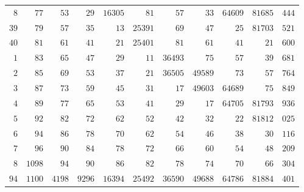 \begin{longtable}{@{}r|r|r|r|r|r|r|r|r|r|r@{}}
$8$ & $77$ & $53$ & $29$ & $16305$ & $81$ & $57$ & $33$ & $64609$ & $81685$ & $444$\\
$39$ & $79$ & $57$ & $35$ & $13$ & $25391$ & $69$ & $47$ & $25$ & $81703$ & $521$\\
$40$ & $81$ & $61$ & $41$ & $21$ & $25401$ & $81$ & $61$ & $41$ & $21$ & $600$\\
$1$ & $83$ & $65$ & $47$ & $29$ & $11$ & $36493$ & $75$ & $57$ & $39$ & $681$\\
$2$ & $85$ & $69$ & $53$ & $37$ & $21$ & $36505$ & $49589$ & $73$ & $57$ & $764$\\
$3$ & $87$ & $73$ & $59$ & $45$ & $31$ & $17$ & $49603$ & $64689$ & $75$ & $849$\\
$4$ & $89$ & $77$ & $65$ & $53$ & $41$ & $29$ & $17$ & $64705$ & $81793$ & $936$\\
$5$ & $92$ & $82$ & $72$ & $62$ & $52$ & $42$ & $32$ & $22$ & $81812$ & $025$\\
$6$ & $94$ & $86$ & $78$ & $70$ & $62$ & $54$ & $46$ & $38$ & $30$ & $116$\\
$7$ & $96$ & $90$ & $84$ & $78$ & $72$ & $66$ & $60$ & $54$ & $48$ & $209$\\
$8$ & $1098$ & $94$ & $90$ & $86$ & $82$ & $78$ & $74$ & $70$ & $66$ & $304$\\
$94$ & $1100$ & $4198$ & $9296$ & $16394$ & $25492$ & $36590$ & $49688$ & $64786$ & $81884$ & $401$\\
\hline\end{longtable}\endgroup
\clearpage
\begingroup\fontsize{8.5}{10}\selectfont\setlength{\tabcolsep}{2pt}\renewcommand{\arraystretch}{1}
